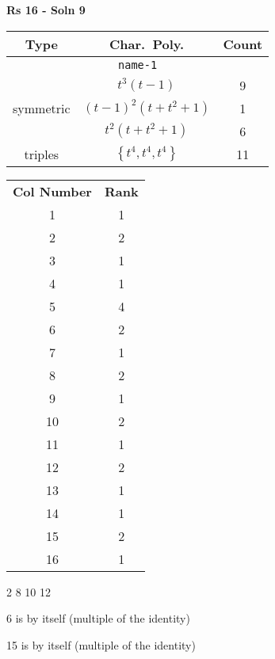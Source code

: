 \documentclass{article}
\begin{document}
    \textbf{Rs 16 - Soln 9}
    \begin{table}
    \begin{tabular}{|c|c|c|}
    \hline
    \textbf{Type} & \textbf{Char.~Poly.} & \textbf{Count} \\
    \hline \multicolumn{3}{|c|}{\texttt{name-1}} \\ \hline
    \multirow{3}{*}{symmetric}
    & $t^3(t - 1)$ & 9 \\
    & $(t - 1)^2(t + t^2 + 1)$ & 1 \\
    & $t^2(t + t^2 + 1)$ & 6 \\
    \hline
    \multirow{1}{*}{triples}
    & $\left\{t^4,t^4,t^4\right\}$ & 11 \\
    \hline
    \end{tabular}
    \end{table}
    \begin{table}
    \begin{tabular}{|c|c|}
    \hline
    \textbf{Col Number} & \textbf{Rank}\\
    1 & 1 \\ 
    2 & 2 \\ 
    3 & 1 \\ 
    4 & 1 \\ 
    5 & 4 \\ 
    6 & 2 \\ 
    7 & 1 \\ 
    8 & 2 \\ 
    9 & 1 \\ 
    10 & 2 \\ 
    11 & 1 \\ 
    12 & 2 \\ 
    13 & 1 \\ 
    14 & 1 \\ 
    15 & 2 \\ 
    16 & 1 \\ 
    \hline
    \end{tabular}
    \end{table}

    2 8 10 12

    6 is by itself (multiple of the identity)

    15 is by itself (multiple of the identity)

    \newpage
\end{document}
